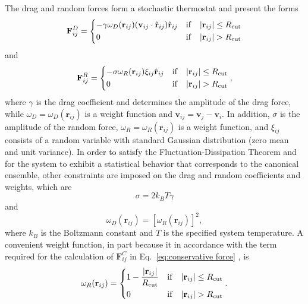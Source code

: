 \documentclass[
aip,
jcp,
reprint,
]{revtex4-1}
\newcommand{\vt}[1]{\boldsymbol{\mathbf{#1}}}          %
\begin{document}
The drag and random forces form a stochastic thermostat and present the forms \cite{Groot_1997}
\begin{equation}
{\vt F}^D_{ij} = \begin{dcases}
-\gamma \omega_D({\vt r}_{ij}) ({\vt v}_{ij} \cdot \hat{\vt r}_{ij}) \hat{\vt r}_{ij} & \mathrm{if} \quad |{\vt r}_{ij}| \leq R_\mathrm{cut} \\
0 & \mathrm{if} \quad |{\vt r}_{ij}| > R_\mathrm{cut}
\end{dcases}
\end{equation}
and
\begin{equation}
{\vt F}^R_{ij} = \begin{dcases}
-\sigma \omega_R({\vt r}_{ij}) \xi_{ij} \hat{\vt r}_{ij} & \mathrm{if} \quad |{\vt r}_{ij}| \leq R_\mathrm{cut} \\
0 & \mathrm{if} \quad |{\vt r}_{ij}| > R_\mathrm{cut}
\end{dcases},
\end{equation}
where $\gamma$ is the drag coefficient and determines the amplitude of the drag force, while $\omega_D = \omega_D({\vt r}_{ij})$ is a weight function and ${\vt v}_{ij} = {\vt v}_j - {\vt v}_i$.
In addition, $\sigma$ is the amplitude of the random force, $\omega_R = \omega_R({\vt r}_{ij})$ is a weight function, and $\xi_{ij}$ consists of a random variable with standard Gaussian distribution (zero mean and unit variance).
In order to satisfy the Fluctuation-Dissipation Theorem and for the system to exhibit a statistical behavior that corresponds to the canonical ensemble, other constraints are imposed on the drag and random coefficients and weights, which are \cite{Espanol_1995}
\begin{equation}
\sigma = 2 k_B T \gamma
\end{equation}
and
\begin{equation}
\omega_D({\vt r}_{ij}) = \left[\omega_R({\vt r}_{ij})\right]^2,
\end{equation}
where $k_B$ is the Boltzmann constant and $T$ is the specified system temperature.
A convenient weight function, in part because it in accordance with the term required for the calculation of ${\vt F}^C_{ij}$ in Eq.~\eqref{eq:conservative force} \cite{Groot_1997}, is
\begin{equation}
\omega_R({\vt r}_{ij}) = \begin{dcases} 1 - \frac{|{\vt r}_{ij}|}{R_\mathrm{cut}} & \mathrm{if} \quad |{\vt r}_{ij}| \leq R_\mathrm{cut} \\
0 & \mathrm{if} \quad |{\vt r}_{ij}| > R_\mathrm{cut}
\end{dcases}.
\end{equation}
\end{document}
